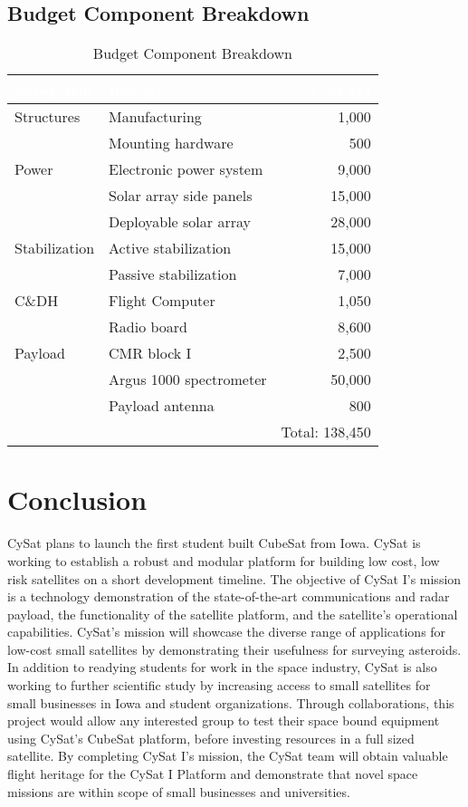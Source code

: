 \documentclass[nocover]            %
{CSLI}                       %
\begin{document}
\subsection{Budget Component Breakdown}
\begin{table}[H]
\centering
\caption{Budget Component Breakdown}
\begin{tabular}{| l | p{5cm} | r |}
\arrayrulecolor{white}
\hline
\rowcolor{gray!80}
\textcolor{white}{\textbf{Subsystem}} & \textcolor{white}{\textbf{Item(s)}} &  \textcolor{white}{\textbf{Cost (\$)}} \\ \hline
\rowcolor{gray!10}
Structures & Manufacturing&1,000 \\
\rowcolor{gray!10}
 &Mounting hardware &500 \\ \hline
\rowcolor{gray!5}
Power & Electronic power system & 9,000\\
\rowcolor{gray!5}
& Solar array side panels &15,000 \\
\rowcolor{gray!5}
& Deployable solar array & 28,000\\ \hline
\rowcolor{gray!10}
Stabilization & Active stabilization&15,000 \\
\rowcolor{gray!10}
&Passive stabilization &7,000 \\ \hline
\rowcolor{gray!5}
C\&DH& Flight Computer &1,050\\
\rowcolor{gray!5}
& Radio board& 8,600\\ \hline
\rowcolor{gray!10}
Payload & CMR block I &2,500 \\
\rowcolor{gray!10}
& Argus 1000 spectrometer &50,000 \\
\rowcolor{gray!10}
& Payload antenna & 800\\\hline
\rowcolor{gray!5}
 &  & Total: 138,450\\ \hline
\end{tabular}
\end{table}

\newpage
\section{Conclusion}
CySat plans to launch the first student built CubeSat from Iowa. CySat is working to establish a robust and modular platform for building low cost, low risk satellites on a short development timeline. The objective of CySat I's mission is a technology demonstration of the state-of-the-art communications and radar payload, the functionality of the satellite platform, and the satellite's operational capabilities. CySat's mission will showcase the diverse range of applications for low-cost small satellites by demonstrating their usefulness for surveying asteroids. In addition to readying students for work in the space industry, CySat is also working to further scientific study by increasing access to small satellites for small businesses in Iowa and student organizations. Through collaborations, this project would allow any interested group to test their space bound equipment using CySat's CubeSat platform, before investing resources in a full sized satellite. By completing CySat I's mission, the CySat team will obtain valuable flight heritage for the CySat I Platform and demonstrate that novel space missions are within scope of small businesses and universities.
\newpage
\end{document}
